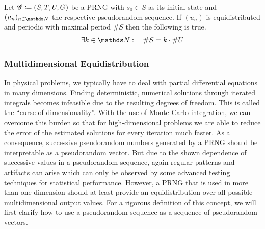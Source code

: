 \documentclass{stdlocal}
\begin{document}
  \begin{corollary}
    Let $\mathscr{G}\coloneqq (S,T,U,G)$ be a PRNG with $s_0\in S$ as its initial state and $(u_n)_{n\in\setNatural}$ the respective pseudorandom sequence.
    If $(u_n)$ is equidistributed and periodic with maximal period $\# S$ then the following is true.
    \[
      \exists k\in\setNatural:\quad \# S = k \cdot \# U
    \]
  \end{corollary}


  \subsubsection*{Multidimensional Equidistribution}
  In physical problems, we typically have to deal with partial differential equations in many dimensions.
  Finding deterministic, numerical solutions through iterated integrals becomes infeasible due to the resulting degrees of freedom.
  This is called the \enquote{curse of dimensionality}.
  With the use of Monte Carlo integration, we can overcome this burden so that for high-dimensional problems we are able to reduce the error of the estimated solutions for every iteration much faster.
  As a consequence, successive pseudorandom numbers generated by a PRNG should be interpretable as a pseudorandom vector.
  But due to the shown dependence of successive values in a pseudorandom sequence, again regular patterns and artifacts can arise which can only be observed by some advanced testing techniques for statistical performance.
  However, a PRNG that is used in more than one dimension should at least provide an equidistribution over all possible multidimensional output values.
  For a rigorous definition of this concept, we will first clarify how to use a pseudorandom sequence as a sequence of pseudorandom vectors.
\end{document}
